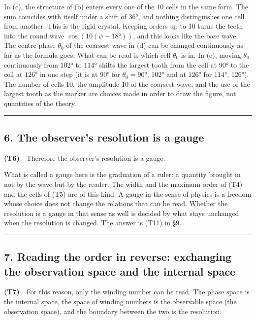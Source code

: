 \documentclass[
  a4paper,
]{article}
\begin{document}
In (c), the structure of (b) enters every one of the 10 cells in the
same form. The sum coincides with itself under a shift of \(36°\), and
nothing distinguishes one cell from another. This is the rigid crystal.
Keeping orders up to 10 turns the teeth into the round wave
\(\cos(10(\psi-18°))\), and this looks like the base wave. The centre
phase \(\theta_0\) of the coarsest wave in (d) can be changed
continuously as far as the formula goes. What can be read is which cell
\(\theta_0\) is in. In (e), moving \(\theta_0\) continuously from
\(102°\) to \(114°\) shifts the largest tooth from the cell at \(90°\)
to the cell at \(126°\) in one step (it is at \(90°\) for
\(\theta_0=90°,\,102°\) and at \(126°\) for \(114°,\,126°\)). The number
of cells 10, the amplitude 10 of the coarsest wave, and the use of the
largest tooth as the marker are choices made in order to draw the
figure, not quantities of the theory.

\begin{center}\rule{0.5\linewidth}{0.5pt}\end{center}

\subsection{6. The observer's resolution is a
gauge}\label{the-observers-resolution-is-a-gauge}

\textbf{(T6)}　Therefore the observer's resolution is a gauge.

What is called a gauge here is the graduation of a ruler: a quantity
brought in not by the wave but by the reader. The width and the maximum
order of (T4) and the cells of (T5) are of this kind. A gauge in the
sense of physics is a freedom whose choice does not change the relations
that can be read. Whether the resolution is a gauge in that sense as
well is decided by what stays unchanged when the resolution is changed.
The answer is (T11) in §9.

\begin{center}\rule{0.5\linewidth}{0.5pt}\end{center}

\subsection{7. Reading the order in reverse: exchanging the observation
space and the internal
space}\label{reading-the-order-in-reverse-exchanging-the-observation-space-and-the-internal-space}

\textbf{(T7)}　For this reason, only the winding number can be read. The
phase space is the internal space, the space of winding numbers is the
observable space (the observation space), and the boundary between the
two is the resolution.
\end{document}
